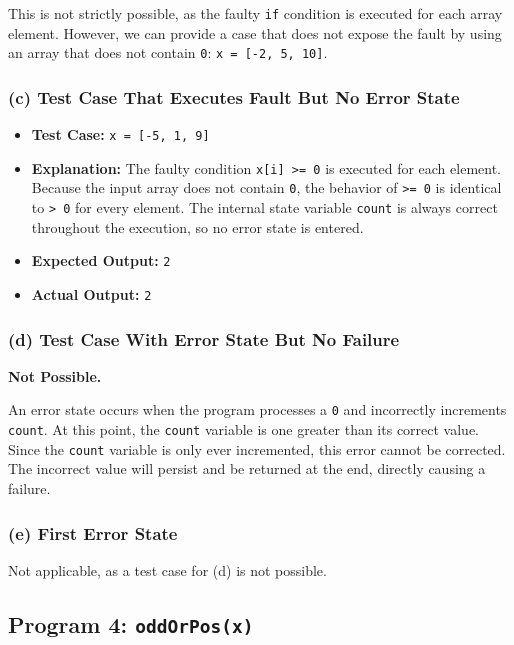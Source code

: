 \documentclass[11pt,a4paper]{article}
\begin{document}
This is not strictly possible, as the faulty \texttt{if} condition is executed for each array element. However, we can provide a case that does not expose the fault by using an array that does not contain \texttt{0}: \texttt{x = [-2, 5, 10]}.

\subsubsection{(c) Test Case That Executes Fault But No Error State}

\begin{itemize}[leftmargin=*]
    \item \textbf{Test Case:} \texttt{x = [-5, 1, 9]}
    \item \textbf{Explanation:} The faulty condition \texttt{x[i] >= 0} is executed for each element. Because the input array does not contain \texttt{0}, the behavior of \texttt{>= 0} is identical to \texttt{> 0} for every element. The internal state variable \texttt{count} is always correct throughout the execution, so no error state is entered.
    \item \textbf{Expected Output:} \texttt{2}
    \item \textbf{Actual Output:} \texttt{2}
\end{itemize}

\subsubsection{(d) Test Case With Error State But No Failure}

\textbf{Not Possible.}

 An error state occurs when the program processes a \texttt{0} and incorrectly increments \texttt{count}. At this point, the \texttt{count} variable is one greater than its correct value. Since the \texttt{count} variable is only ever incremented, this error cannot be corrected. The incorrect value will persist and be returned at the end, directly causing a failure.

\subsubsection{(e) First Error State}

Not applicable, as a test case for (d) is not possible.

\subsection{Program 4: \texttt{oddOrPos(x)}}
\end{document}
